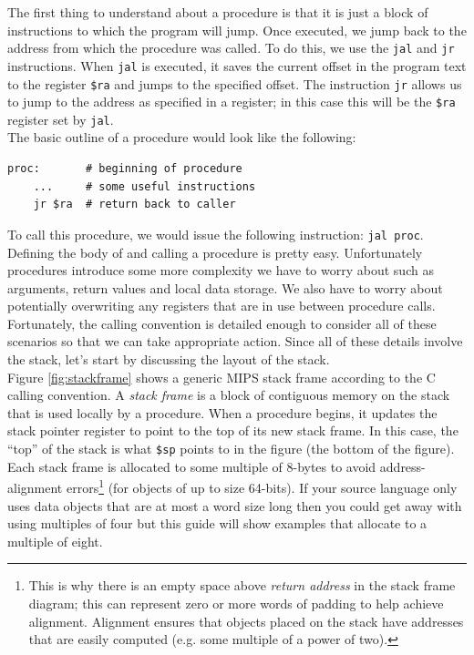 \documentclass[12pt]{article}
\begin{document}
The first thing to understand about a procedure is that it is just a block of
     instructions to which the program will jump. Once executed, we jump back to
     the address from which the procedure was called. To do this, we use the
     \texttt{jal} and \texttt{jr} instructions. When \texttt{jal} is executed,
     it saves the current offset in the program text to the register
     \texttt{\$ra} and jumps to the specified offset. The instruction
     \texttt{jr} allows us to jump to the address as specified in a register; in
     this case this will be the \texttt{\$ra} register set by \texttt{jal}.\\

The basic outline of a procedure would look like the following:\\
\begin{lstlisting}
proc:       # beginning of procedure
    ...     # some useful instructions
    jr $ra  # return back to caller
\end{lstlisting}

To call this procedure, we would issue the following instruction: \texttt{jal
     proc}.\\

Defining the body of and calling a procedure is pretty easy. Unfortunately
     procedures introduce some more complexity we have to worry about such as
     arguments, return values and local data storage. We also have to worry
     about potentially overwriting any registers that are in use between
     procedure calls. Fortunately, the calling convention is detailed enough to
     consider all of these scenarios so that we can take appropriate
     action. Since all of these details involve the stack, let's start by
     discussing the layout of the stack.\\

Figure \ref{fig:stackframe} shows a generic MIPS stack frame according to the C
     calling convention. A \textit{stack frame} is a block of contiguous memory
     on the stack that is used locally by a procedure. When a procedure begins,
     it updates the stack pointer register to point to the top of its new stack
     frame. In this case, the ``top'' of the stack is what \texttt{\$sp} points
     to in the figure (the bottom of the figure). Each stack frame is allocated
     to some multiple of 8-bytes to avoid address-alignment errors\footnote{This
     is why there is an empty space above \textit{return address} in the stack
     frame diagram; this can represent zero or more words of padding to help
     achieve alignment. Alignment ensures that objects placed on the stack have
     addresses that are easily computed (e.g. some multiple of a power of two).}
      (for objects of up to size 64-bits). If your source language only uses
     data objects that are at most a word size long then you could get away with
     using multiples of four but this guide will show examples that allocate to
     a multiple of eight.\\
\end{document}
